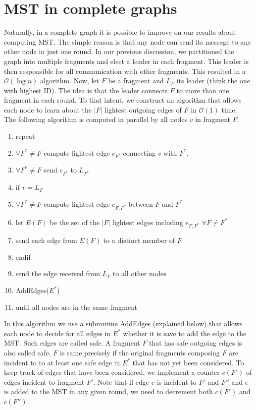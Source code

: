 \documentclass[a4paper, 12pt]{article}
\theoremstyle{plain}
\theoremstyle{definition}
\theoremstyle{lemma}
\theoremstyle{remark}
\theoremstyle{corollary}
\theoremstyle{example}
\begin{document}
\section{MST in complete graphs}
	Naturally, in a complete graph it is possible to improve on our results about computing MST. The simple reason is that any node can send its message to any other node in just one round. In our previous discussion, we partitioned the graph into multiple fragments and elect a leader in each fragment. This leader is then responsible for all communication with other fragments. This resulted in a $\mathcal{O}(\log n)$ algorithm.
	Now, let $F$ be a fragment and $L_F$ its leader (think the one with highest ID). The idea is that the leader connects $F$ to more than one fragment in each round. To that intent, we construct an algorithm that allows each node to learn about the $\left|F\right|$ lightest outgoing edges of $F$ in $\mathcal{O}(1)$ time.\\
	The following algorithm is computed in parallel by all nodes $v$ in fragment $F$.
	\begin{enumerate}
		\item repeat
		\item $\forall F^* \neq F$ compute lightest edge $e_{F^*}$ connecting $v$ with $F^*$.
		\item $\forall F^* \neq F$ send $e_{F^*}$ to $L_{F^*}$
		\item if $v = L_F$
		\item $\forall F^* \neq F$ compute lightest edge $e_{F,F^*}$ between $F$ and $F^*$
		\item let $E(F)$ be the set of the $\left|F\right|$ lightest edges including $e_{F,F^*}$ $\forall F\neq F^*$
		\item send each edge from $E(F)$ to a distinct member of $F$
		\item endif
		\item send the edge received from $L_F$ to all other nodes
		\item AddEdges($E^*$)
		\item until all nodes are in the same fragment
	\end{enumerate}
	In this algorithm we use a subroutine AddEdges (explained below) that allows each node to decide for all edges in $E^*$ whether it is save to add the edge to the MST. Such edges are called safe. A fragment $F$ that has safe outgoing edges is also called safe. $F$ is same precisely if the original fragments composing $F$ are incident to to at least one safe edge in $E^*$ that has not yet been considered. To keep track of edges that have been considered, we implement a counter $c(F')$ of edges incident to fragment $F'$. Note that if edge $e$ is incident to $F'$ and $F''$ and $e$ is added to the MST in any given round, we need to decrement both $c(F')$ and $c(F'')$.\\
\end{document}
